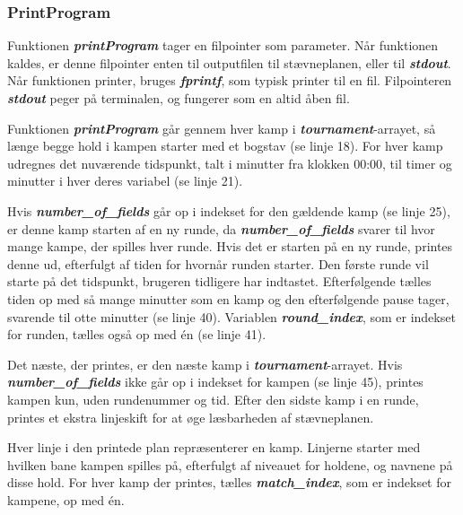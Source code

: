 \subsubsection{PrintProgram}
Funktionen \textbf{\textit{printProgram}} tager en filpointer som parameter. Når funktionen kaldes, er denne filpointer enten til outputfilen til stævneplanen, eller til \textbf{\textit{stdout}}. Når funktionen printer, bruges \textbf{\textit{fprintf}}, som typisk printer til en fil. Filpointeren \textbf{\textit{stdout}} peger på terminalen, og fungerer som en altid åben fil. 
\par
Funktionen \textbf{\textit{printProgram}} går gennem hver kamp i \textbf{\textit{tournament}}-arrayet, så længe begge hold i kampen starter med et bogstav (se linje 18). For hver kamp udregnes det nuværende tidspunkt, talt i minutter fra klokken 00:00, til timer og minutter i hver deres variabel (se linje 21).
\par
Hvis \textbf{\textit{number\_of\_fields}} går op i indekset for den gældende kamp (se linje 25), er denne kamp starten af en ny runde, da \textbf{\textit{number\_of\_fields}} svarer til hvor mange kampe, der spilles hver runde. Hvis det er starten på en ny runde, printes denne ud, efterfulgt af tiden for hvornår runden starter. Den første runde vil starte på det tidspunkt, brugeren tidligere har indtastet. Efterfølgende tælles tiden op med så mange minutter som en kamp og den efterfølgende pause tager, svarende til otte minutter (se linje 40). Variablen \textbf{\textit{round\_index}}, som er indekset for runden, tælles også op med én (se linje 41). 
\par
Det næste, der printes, er den næste kamp i \textbf{\textit{tournament}}-arrayet. Hvis \textbf{\textit{number\_of\_fields}} ikke går op i indekset for kampen (se linje 45), printes kampen kun, uden rundenummer og tid. Efter den sidste kamp i en runde, printes et ekstra linjeskift for at øge læsbarheden af stævneplanen. 
\par
Hver linje i den printede plan repræsenterer en kamp. Linjerne starter med hvilken bane kampen spilles på, efterfulgt af niveauet for holdene, og navnene på disse hold. For hver kamp der printes, tælles \textbf{\textit{match\_index}}, som er indekset for kampene, op med én. \\

\clearpage

